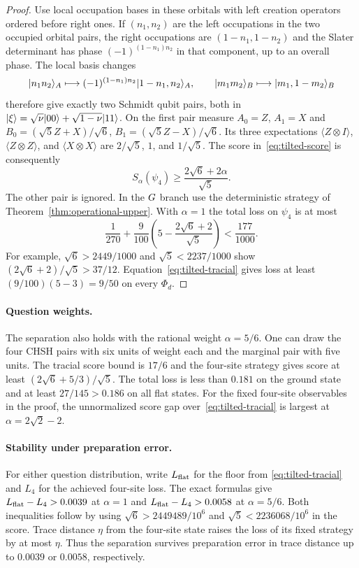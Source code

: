 \begin{proof}
Use local occupation bases in these orbitals with left creation operators
ordered before right ones. If $(n_1,n_2)$ are the left occupations in the
two occupied orbital pairs, the right occupations are $(1-n_1,1-n_2)$
and the Slater determinant has phase $(-1)^{(1-n_1)n_2}$ in that component,
up to an overall phase. The local basis changes
\[
 |n_1n_2\rangle_A\longmapsto (-1)^{(1-n_1)n_2}|1-n_1,n_2\rangle_A,
 \qquad
 |m_1m_2\rangle_B\longmapsto|m_1,1-m_2\rangle_B
\]
therefore give exactly two Schmidt qubit pairs, both in
$|\xi\rangle=\sqrt\nu|00\rangle+\sqrt{1-\nu}|11\rangle$.
On the first pair measure $A_0=Z$, $A_1=X$ and
$B_0=(\sqrt5Z+X)/\sqrt6$, $B_1=(\sqrt5Z-X)/\sqrt6$. Its three
expectations $\langle Z\otimes I\rangle$, $\langle Z\otimes Z\rangle$,
and $\langle X\otimes X\rangle$ are $2/\sqrt5$, $1$, and $1/\sqrt5$.
The score in~\eqref{eq:tilted-score} is consequently
\begin{equation}\label{eq:tilted-xx4-score}
 S_\alpha(\psi_4)\ge \frac{2\sqrt6+2\alpha}{\sqrt5}.
\end{equation}
The other pair is ignored. In the $G$ branch use the deterministic
strategy of Theorem~\ref{thm:operational-upper}. With $\alpha=1$ the
total loss on $\psi_4$ is at most
\[
 \frac1{270}+\frac9{100}\left(5-\frac{2\sqrt6+2}{\sqrt5}\right)
 <\frac{177}{1000}.
\]
For example, $\sqrt6>2449/1000$ and $\sqrt5<2237/1000$ show
$(2\sqrt6+2)/\sqrt5>37/12$. Equation~\eqref{eq:tilted-tracial}
gives loss at least $(9/100)(5-3)=9/50$ on every $\Phi_d$.
\end{proof}

\paragraph{Question weights.}
The separation also holds with the rational weight $\alpha=5/6$.
One can draw the four CHSH pairs with six units of weight each and the
marginal pair with five units. The tracial score bound is $17/6$ and the
four-site strategy gives score at least $(2\sqrt6+5/3)/\sqrt5$.
The total loss is less than $0.181$ on the ground state and at least
$27/145>0.186$ on all flat states. For the fixed four-site observables in
the proof, the unnormalized score gap over~\eqref{eq:tilted-tracial} is
largest at $\alpha=2\sqrt2-2$.

\paragraph{Stability under preparation error.}
For either question distribution, write $L_{\rm flat}$ for the floor from
\eqref{eq:tilted-tracial} and $L_4$ for the achieved four-site loss. The
exact formulas give $L_{\rm flat}-L_4>0.0039$ at $\alpha=1$ and
$L_{\rm flat}-L_4>0.0058$ at $\alpha=5/6$. Both inequalities follow by
using $\sqrt6>2449489/10^6$ and $\sqrt5<2236068/10^6$ in the score.
Trace distance $\eta$ from the four-site state raises the loss of its
fixed strategy by at most $\eta$. Thus the separation survives preparation
error in trace distance up to $0.0039$ or $0.0058$, respectively.

